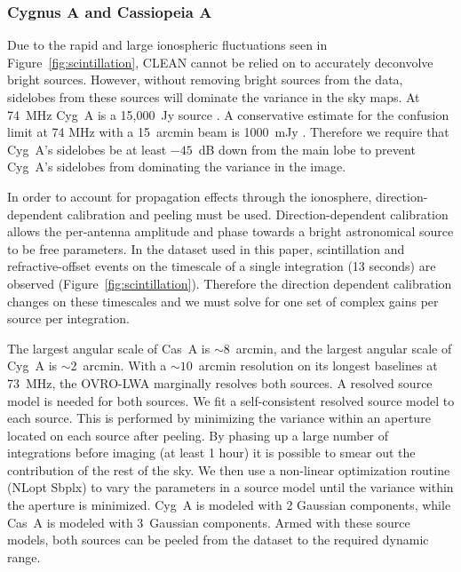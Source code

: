 \documentclass[twocolumn]{aastex61}
\begin{document}
\subsubsection{Cygnus A and Cassiopeia A}

Due to the rapid and large ionospheric fluctuations seen in Figure~\ref{fig:scintillation}, CLEAN
cannot be relied on to accurately deconvolve bright sources.  However, without removing bright
sources from the data, sidelobes from these sources will dominate the variance in the sky maps.  At
74~MHz Cyg~A is a 15,000~Jy source \citep{1977A&A....61...99B}. A conservative estimate for the
confusion limit at 74 MHz with a 15~arcmin beam is 1000~mJy \citep{2014MNRAS.440..327L}. Therefore
we require that Cyg~A's sidelobes be at least $-45$~dB down from the main lobe to prevent Cyg~A's
sidelobes from dominating the variance in the image.

In order to account for propagation effects through the ionosphere, direction-dependent calibration
and peeling \citep{2008ISTSP...2..707M, 2015MNRAS.449.2668S} must be used.  Direction-dependent
calibration allows the per-antenna amplitude and phase towards a bright astronomical source to be
free parameters. In the dataset used in this paper, scintillation and refractive-offset events on
the timescale of a single integration (13 seconds) are observed (Figure~\ref{fig:scintillation}).
Therefore the direction dependent calibration changes on these timescales and we must solve for one
set of complex gains per source per integration.

The largest angular scale of Cas~A is $\sim$8~arcmin, and the largest angular scale of Cyg~A is
$\sim$2~arcmin. With a $\sim10$~arcmin resolution on its longest baselines at 73~MHz, the OVRO-LWA
marginally resolves both sources. A resolved source model is needed for both sources. We fit a
self-consistent resolved source model to each source. This is performed by minimizing the variance
within an aperture located on each source after peeling. By phasing up a large number of
integrations before imaging (at least 1 hour) it is possible to smear out the contribution of the
rest of the sky.  We then use a non-linear optimization routine (NLopt Sbplx) \citep{nlopt, sbplx}
to vary the parameters in a source model until the variance within the aperture is minimized. Cyg~A
is modeled with 2 Gaussian components, while Cas~A is modeled with 3~Gaussian components. Armed with
these  source models, both sources can be peeled from the dataset to the required dynamic range.
\end{document}
